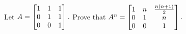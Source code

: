 \begin{pro}
Let $A = \begin{bmatrix} 1 & 1 & 1 \cr
0 & 1 & 1 \cr 0 & 0 & 1 \cr
\end{bmatrix}. $
Prove that
$A^n = \begin{bmatrix} 1 & n & \frac{n(n + 1)}{2} \cr 0 & 1 & n \cr
0 & 0 & 1 \cr
\end{bmatrix}.$
\end{pro}